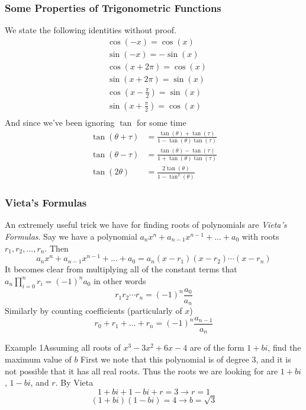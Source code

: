 \subsubsection{Some Properties of Trigonometric Functions}
We state the following identities without proof.
\begin{align*}
	&\cos(-x) = \cos(x)\\
	&\sin(-x) = -\sin(x)\\
	&\cos(x + 2\pi) = \cos(x)\\
	&\sin(x + 2\pi) = \sin(x)\\
	&\cos\left(x - \frac{\pi}{2}\right) = \sin(x)\\
	&\sin\left( x + \frac{\pi}{2}\right) = \cos(x)\\
\end{align*}
And since we've been ignoring $\tan$ for some time
\begin{align*}
	\tan(\theta + \tau) & = \frac{\tan(\theta)+\tan(\tau)}{1-\tan(\theta)\tan(\tau)} \\
	\tan(\theta - \tau) & = \frac{\tan(\theta) - \tan(\tau)}{1 + \tan(\theta)\tan(\tau)}\\
	\tan(2\theta) &= \frac{2\tan(\theta)}{1-\tan^{2}(\theta)}
\end{align*}

\subsubsection{Vieta's Formulas}
An extremely useful trick we have for finding roots of polynomials are \textit{Vieta's Formulas}.
Say we have a polynomial $a_n x^n + a_{n-1}x^{n-1} + ... + a_{0}$ with roots $r_{1}, r_2, ..., r_n$.
Then $$a_{n}x^n + a_{n-1}x^{n-1} + ... + a_0 = a_{n}(x-r_1)(x-r_2)\cdots(x-r_n)$$
It becomes clear from multiplying all of the constant terms that $a_{n}\prod_{i=0}^{n}r_i = (-1)^{n}a_0$ in other words $$r_1 r_2 \cdots r_n = (-1)^{n}\frac{a_0}{a_n}$$
Similarly by counting coefficients (particularly of $x$)$$r_0 + r_1 + ... + r_n = (-1)^{n} \frac{a_{n-1}}{a_n}$$

\begin{problem}{Example 1}{Assuming all roots of $x^3 - 3x^2 + 6x - 4$ are of the form $1+bi$, find the maximum value of $b$}
	First we note that this polynomial is of degree 3, and it is not possible that it has all real roots.
	Thus the roots we are looking for are $1+bi$, $1-bi$, and $r$. By Vieta $$1+bi + 1 -bi + r = 3 \rightarrow r = 1$$
	$$(1+bi)(1-bi) = 4 \rightarrow b = \sqrt{3}$$
\end{problem}

